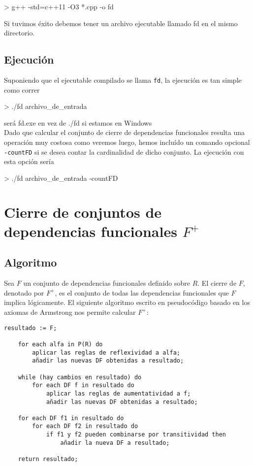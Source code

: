 \documentclass{article}
\begin{document}
\begin{commandshell}
> g++ -std=c++11 -O3 *.cpp -o fd
\end{commandshell}

Si tuvimos éxito debemos tener un archivo ejecutable llamado fd en el mismo directorio.

\subsection{Ejecución}
Suponiendo que el ejecutable compilado se llama \verb|fd|, la ejecución es tan simple como correr

\begin{commandshell}
> ./fd archivo_de_entrada
\end{commandshell}
\small{será fd.exe en vez de ./fd si estamos en Windows} \\

Dado que calcular el conjunto de cierre de dependencias funcionales resulta una operación muy costosa como veremos luego, hemos incluído un comando opcional \verb|-countFD| si se desea contar la cardinalidad de dicho conjunto. La ejecución con esta opción sería

\begin{commandshell}
> ./fd archivo_de_entrada -countFD
\end{commandshell}

\newpage
\section{Cierre de conjuntos de dependencias funcionales $F^{+}$}
\subsection{Algoritmo}
Sea $F$ un conjunto de dependencias funcionales definido sobre $R$. El cierre de $F$, denotado por $F^{+}$, es el conjunto de todas las dependencias funcionales que $F$ implica lógicamente. El siguiente algoritmo escrito en pseudocódigo basado en los axiomas de Armstrong nos permite calcular $F^{+}$:

\begin{Verbatim}[frame=single]
    resultado := F;
    
    for each alfa in P(R) do
        aplicar las reglas de reflexividad a alfa;
        añadir las nuevas DF obtenidas a resultado;
        
    while (hay cambios en resultado) do
        for each DF f in resultado do
            aplicar las reglas de aumentatividad a f;
            añadir las nuevas DF obtenidas a resultado;
            
    for each DF f1 in resultado do
        for each DF f2 in resultado do
            if f1 y f2 pueden combinarse por transitividad then
                añadir la nueva DF a resultado;
                
    return resultado;
\end{Verbatim}
\end{document}
